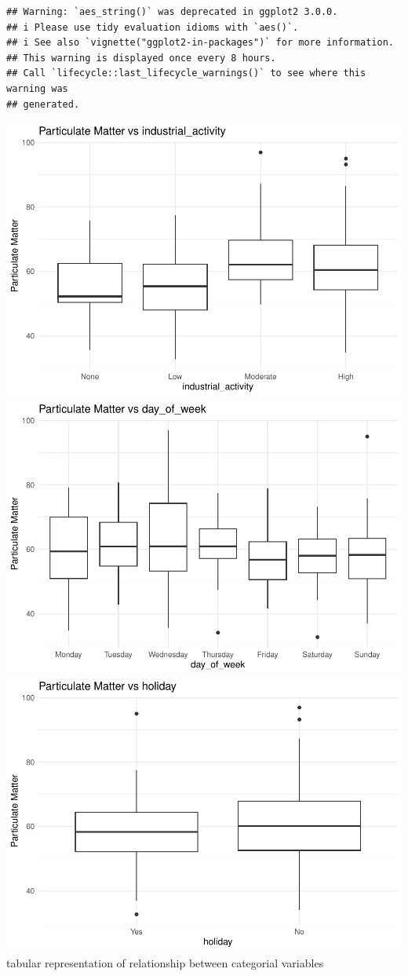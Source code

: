 \documentclass[
]{article}
\begin{document}
\begin{verbatim}
## Warning: `aes_string()` was deprecated in ggplot2 3.0.0.
## i Please use tidy evaluation idioms with `aes()`.
## i See also `vignette("ggplot2-in-packages")` for more information.
## This warning is displayed once every 8 hours.
## Call `lifecycle::last_lifecycle_warnings()` to see where this warning was
## generated.
\end{verbatim}

\includegraphics{Report_files/figure-latex/unnamed-chunk-2-1.pdf}
\includegraphics{Report_files/figure-latex/unnamed-chunk-2-2.pdf}
\includegraphics{Report_files/figure-latex/unnamed-chunk-2-3.pdf}
tabular representation of relationship between categorial variables
\end{document}
